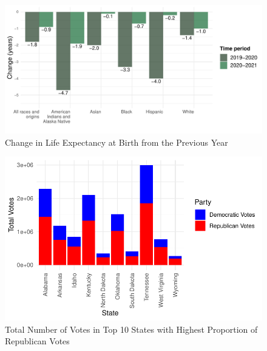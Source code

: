 \documentclass[
  letterpaper,
  DIV=11,
  numbers=noendperiod]{scrartcl}
\begin{document}
\begin{figure}

{\centering \includegraphics{paper_files/figure-pdf/fig-CLE-1.pdf}

}

\caption{\label{fig-CLE}Change in Life Expectancy at Birth from the
Previous Year}

\end{figure}

\begin{figure}

{\centering \includegraphics{paper_files/figure-pdf/fig-Vote-1.pdf}

}

\caption{\label{fig-Vote}Total Number of Votes in Top 10 States with
Highest Proportion of Republican Votes}

\end{figure}
\end{document}
